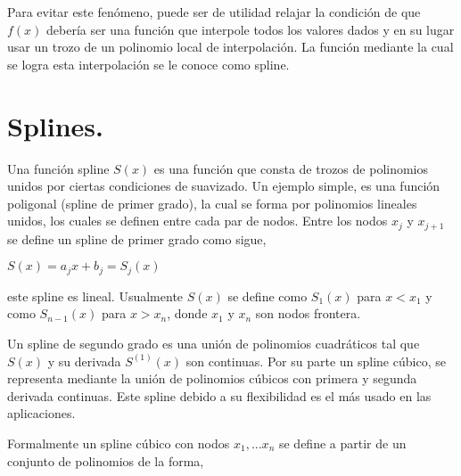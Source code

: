 \vspace{0.5cm}

\hspace{0.4cm} Para evitar este fen\'omeno, puede ser de utilidad relajar la condici\'on de que $f(x)$ deber\'ia ser una funci\'on que interpole todos los valores dados y en su lugar usar un trozo de un polinomio local de interpolaci\'on. La funci\'on mediante la cual se logra esta interpolaci\'on se le conoce como spline.


\section{Splines.}

\vspace{1 cm}

\hspace{0.4cm} Una funci\'on spline $S(x)$ es una funci\'on que consta de trozos de polinomios unidos por ciertas condiciones de suavizado. Un ejemplo simple, es una funci\'on poligonal (spline de primer grado), la cual se forma por polinomios lineales unidos, los cuales se definen entre cada par de nodos. Entre los nodos $x_{j}$ y $x_{j+1}$ se define un spline de primer grado como sigue, \\

\begin{center}

$\displaystyle{S(x) = a_{j}x + b_{j} = S_{j}(x)}$

\end{center}

\vspace{0.5cm}

\noindent este spline es lineal. Usualmente $S(x)$ se define como $S_{1}(x)$ para $x<x_{1}$ y como $S_{n-1}(x)$ para $x>x_{n}$, donde $x_{1}$ y $x_{n}$ son nodos frontera.

\vspace{0.5cm}

\hspace{0.4cm} Un spline de segundo grado es una uni\'on de polinomios cuadr\'aticos tal que $S(x)$ y su derivada $S^{(1)}(x)$ son continuas. Por su parte un spline c\'ubico, se representa mediante la uni\'on de polinomios c\'ubicos con primera y segunda derivada continuas. Este spline debido a su flexibilidad es el m\'as usado en las aplicaciones.

\vspace{0.5cm}

\hspace{0.4cm}Formalmente un spline c\'ubico con nodos $x_{1},...x_{n}$ se define a partir de un conjunto de polinomios de la forma,\\

